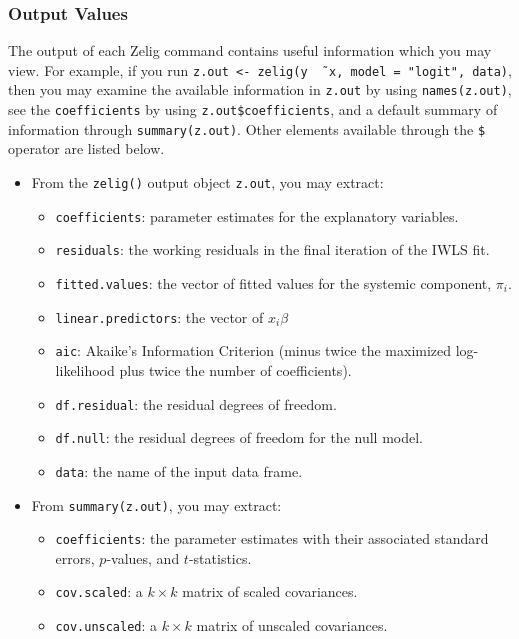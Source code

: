 \documentclass{article}
\begin{document}
\subsubsection{Output Values}

The output of each Zelig command contains useful information which you
may view.  For example, if you run \texttt{z.out <- zelig(y \~\, x,
  model = "logit", data)}, then you may examine the available
information in \texttt{z.out} by using \texttt{names(z.out)},
see the {\tt coefficients} by using {\tt z.out\$coefficients}, and
a default summary of information through \texttt{summary(z.out)}.
Other elements available through the {\tt \$} operator are listed
below.

\begin{itemize}
\item From the {\tt zelig()} output object {\tt z.out}, you may
  extract:
   \begin{itemize}
   \item {\tt coefficients}: parameter estimates for the explanatory
     variables.
   \item {\tt residuals}: the working residuals in the final iteration
     of the IWLS fit.
   \item {\tt fitted.values}: the vector of fitted values for the
     systemic component, $\pi_i$.
   \item {\tt linear.predictors}: the vector of $x_{i}\beta$
   \item {\tt aic}: Akaike's Information Criterion (minus twice the
     maximized log-likelihood plus twice the number of coefficients).
   \item {\tt df.residual}: the residual degrees of freedom.
   \item {\tt df.null}: the residual degrees of freedom for the null
     model.
   \item {\tt data}: the name of the input data frame.  
   \end{itemize}

\item From {\tt summary(z.out)}, you may extract: 
   \begin{itemize}
   \item {\tt coefficients}: the parameter estimates with their
     associated standard errors, $p$-values, and $t$-statistics.
   \item{\tt cov.scaled}: a $k \times k$ matrix of scaled covariances.
   \item{\tt cov.unscaled}: a $k \times k$ matrix of unscaled
     covariances.  
   \end{itemize}


\end{itemize}
\end{document}
